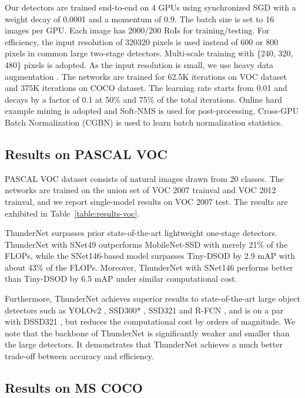 \documentclass[10pt,twocolumn,letterpaper]{article}
\begin{document}
Our detectors are trained end-to-end on 4 GPUs using synchronized SGD with a weight decay of 0.0001 and a momentum of 0.9.
The batch size is set to 16 images per GPU.
Each image has 2000/200 RoIs for training/testing.
For efficiency, the input resolution of 320320 pixels is used instead of 600 or 800 pixels in common large two-stage detectors.
Multi-scale training with \{240, 320, 480\} pixels is adopted.
As the input resolution is small, we use heavy data augmentation \cite{liu2016ssd}.
The networks are trained for 62.5K iterations on VOC dataset and 375K iterations on COCO dataset.
The learning rate starts from 0.01 and decays by a factor of 0.1 at 50\% and 75\% of the total iterations.
Online hard example mining \cite{shrivastava2016training} is adopted and Soft-NMS \cite{bodla2017soft} is used for post-processing.
Cross-GPU Batch Normalization (CGBN) \cite{peng2018megdet} is used to learn batch normalization statistics.

\subsection{Results on PASCAL VOC}

PASCAL VOC dataset consists of natural images drawn from 20 classes.
The networks are trained on the union set of VOC 2007 trainval and VOC 2012 trainval, and we report single-model results on VOC 2007 test.
The results are exhibited in Table~\ref{table:results-voc}.

ThunderNet surpasses prior state-of-the-art lightweight one-stage detectors.
ThunderNet with SNet49 outperforms MobileNet-SSD with merely 21\% of the FLOPs, while the SNet146-based model surpasses Tiny-DSOD by 2.9 mAP with about 43\% of the FLOPs.
Moreover, ThunderNet with SNet146 performs better than Tiny-DSOD by 6.5 mAP under similar computational cost.

Furthermore, ThunderNet achieves superior results to state-of-the-art large object detectors such as YOLOv2 \cite{redmon2017yolo9000}, SSD300* \cite{liu2016ssd}, SSD321 \cite{liu2016ssd} and R-FCN \cite{dai2016r}, and is on a par with DSSD321 \cite{fu2017dssd}, but reduces the computational cost by orders of magnitude.
We note that the backbone of ThunderNet is significantly weaker and smaller than the large detectors.
It demonstrates that ThunderNet achieves a much better trade-off between accuracy and efficiency.

\subsection{Results on MS COCO}
\end{document}
